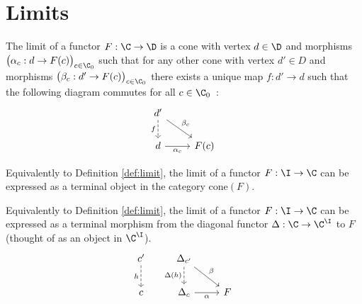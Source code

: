 \section{Limits}

\begin{definition}
	The limit of a functor $F:\C\to \D$ is a cone with vertex $d\in \D$ and
	morphisms $\big(\alpha_c: d \to F(c)\big)_{c\in \C_0}$ such that for any other
	cone with vertex $d'\in D$ and morphisms $\big(\beta_c: d' \to F(c)\big)_{c\in
	\C_0}$ there exists a unique map $f:d'\to d$ such that the following diagram
	commutes for all $c\in
	\C_0$~\parencite[p.~118]{leinster:basic_category_theory}:
	\[\begin{tikzcd}
		{d'} \\
		d & {F(c)}
		\arrow["{\alpha_c}"', from=2-1, to=2-2]
		\arrow["{\beta_c}", from=1-1, to=2-2]
		\arrow["f"', dashed, from=1-1, to=2-1]
	\end{tikzcd}\]
\end{definition}

\begin{definition}
	Equivalently to Definition \ref{def:limit}, the limit of a functor $F:\I\to
	\C$ can be expressed as a terminal object in the category $\mathrm{cone}(F)$.
\end{definition}

\begin{definition}
	Equivalently to Definition \ref{def:limit}, the limit of a functor $F:\I\to
	\C$ can be expressed as a terminal morphism from the diagonal functor $\Delta:
	\C \to \C^\I$ to $F$ (thought of as an object in $\C^\I$).
	\[\begin{tikzcd}[ampersand replacement=\&]
		{c'} \& {\Delta_{c'}} \\
		c \& {\Delta_c} \& F
		\arrow["h"', dashed, from=1-1, to=2-1]
		\arrow["{\Delta(h)}"', dashed, from=1-2, to=2-2]
		\arrow["\beta", from=1-2, to=2-3]
		\arrow["\alpha"', from=2-2, to=2-3]
	\end{tikzcd}\]
\end{definition}

